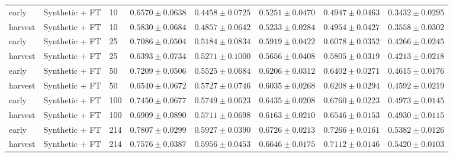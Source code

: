 \documentclass{article}
\begin{document}
\begin{lrbox}{\resulttable}
\begin{tabular}{llllllll}
early & Synthetic + FT & 10 & $0.6570 \pm 0.0638$ & $0.4458 \pm 0.0725$ & $0.5251 \pm 0.0470$ & $0.4947 \pm 0.0463$ & $0.3432 \pm 0.0295$ \\
harvest & Synthetic + FT & 10 & $0.5830 \pm 0.0684$ & $0.4857 \pm 0.0642$ & $0.5233 \pm 0.0284$ & $0.4954 \pm 0.0427$ & $0.3558 \pm 0.0302$ \\
early & Synthetic + FT & 25 & $0.7086 \pm 0.0504$ & $0.5184 \pm 0.0834$ & $0.5919 \pm 0.0422$ & $0.6078 \pm 0.0352$ & $0.4266 \pm 0.0245$ \\
harvest & Synthetic + FT & 25 & $0.6393 \pm 0.0734$ & $0.5271 \pm 0.1000$ & $0.5656 \pm 0.0408$ & $0.5805 \pm 0.0319$ & $0.4213 \pm 0.0218$ \\
early & Synthetic + FT & 50 & $0.7209 \pm 0.0506$ & $0.5525 \pm 0.0684$ & $0.6206 \pm 0.0312$ & $0.6402 \pm 0.0271$ & $0.4615 \pm 0.0176$ \\
harvest & Synthetic + FT & 50 & $0.6540 \pm 0.0672$ & $0.5727 \pm 0.0746$ & $0.6035 \pm 0.0268$ & $0.6208 \pm 0.0294$ & $0.4592 \pm 0.0219$ \\
early & Synthetic + FT & 100 & $0.7450 \pm 0.0677$ & $0.5749 \pm 0.0623$ & $0.6435 \pm 0.0208$ & $0.6760 \pm 0.0223$ & $0.4973 \pm 0.0145$ \\
harvest & Synthetic + FT & 100 & $0.6909 \pm 0.0890$ & $0.5711 \pm 0.0698$ & $0.6163 \pm 0.0210$ & $0.6546 \pm 0.0153$ & $0.4930 \pm 0.0115$ \\
early & Synthetic + FT & 214 & $0.7807 \pm 0.0299$ & $0.5927 \pm 0.0390$ & $0.6726 \pm 0.0213$ & $0.7266 \pm 0.0161$ & $0.5382 \pm 0.0126$ \\
harvest & Synthetic + FT & 214 & $0.7576 \pm 0.0387$ & $0.5956 \pm 0.0453$ & $0.6646 \pm 0.0175$ & $0.7112 \pm 0.0146$ & $0.5420 \pm 0.0103$ \\
\bottomrule
\end{tabular}\end{lrbox}
\noindent\ifdim\wd\resulttable>\linewidth\resizebox{.99\linewidth}{!}{\usebox{\resulttable}}\else\usebox{\resulttable}\fi
\clearpage
\end{document}
